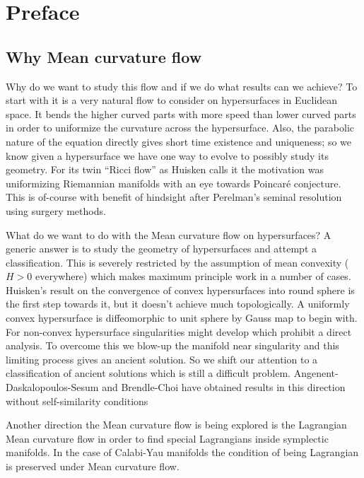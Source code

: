 \chapter{Preface}

\section*{Why Mean curvature flow}

Why do we want to study this flow and if we do what results can we achieve? To start with it is a very natural flow to consider on hypersurfaces in Euclidean space. It bends the higher curved parts with more speed than lower curved parts in order to uniformize the curvature across the hypersurface. Also, the parabolic nature of the equation directly gives short time existence and uniqueness; so we know given a hypersurface we have one way to evolve to possibly study its geometry. For its twin ``Ricci flow'' as Huisken calls it the motivation was uniformizing Riemannian manifolds with an eye towards Poincar\'e conjecture. This is of-course with benefit of hindsight after Perelman's seminal resolution using surgery methods. 

What do we want to do with the Mean curvature flow on hypersurfaces? A generic answer is to study the geometry of hypersurfaces and attempt a classification. This is severely restricted by the assumption of mean convexity ($ H>0 $ everywhere) which makes maximum principle work in a number of cases. Huisken's result on the convergence of convex hypersurfaces into round sphere is the first step towards it, but it doesn't achieve much topologically. A uniformly convex hypersurface is diffeomorphic to unit sphere by Gauss map to begin with. For non-convex hypersurface singularities might develop which prohibit a direct analysis. To overcome this we blow-up the manifold near singularity and this limiting process gives an ancient solution. So we shift our attention to a classification of ancient solutions which is still a difficult problem. Angenent-Daskalopoulos-Sesum and Brendle-Choi have obtained results in this direction without self-similarity conditions

Another direction the Mean curvature flow is being explored is the Lagrangian Mean curvature flow in order to find special Lagrangians inside symplectic manifolds. In the case of Calabi-Yau manifolds the condition of being Lagrangian is preserved under Mean curvature flow.

